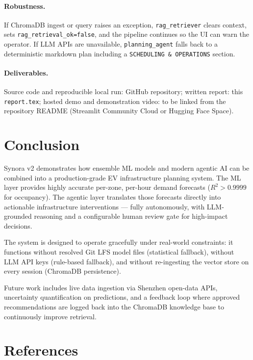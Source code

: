 \documentclass[12pt,a4paper]{article}
\begin{document}
\paragraph{Robustness.}
If ChromaDB ingest or query raises an exception, \texttt{rag\_retriever} clears
context, sets \texttt{rag\_retrieval\_ok=false}, and the pipeline continues so
the UI can warn the operator. If LLM APIs are unavailable, \texttt{planning\_agent}
falls back to a deterministic markdown plan including a
\texttt{SCHEDULING \& OPERATIONS} section.

\paragraph{Deliverables.}
Source code and reproducible local run: GitHub repository;
written report: this \texttt{report.tex};
hosted demo and demonstration video: to be linked from the repository README
(Streamlit Community Cloud or Hugging Face Space).

\section{Conclusion}

Synora v2 demonstrates how ensemble ML models and modern agentic AI can be
combined into a production-grade EV infrastructure planning system. The ML layer
provides highly accurate per-zone, per-hour demand forecasts ($R^2 > 0.9999$ for
occupancy). The agentic layer translates those forecasts directly into actionable
infrastructure interventions — fully autonomously, with LLM-grounded reasoning
and a configurable human review gate for high-impact decisions.

The system is designed to operate gracefully under real-world constraints: it
functions without resolved Git LFS model files (statistical fallback), without
LLM API keys (rule-based fallback), and without re-ingesting the vector store
on every session (ChromaDB persistence).

Future work includes live data ingestion via Shenzhen open-data APIs, uncertainty
quantification on predictions, and a feedback loop where approved recommendations
are logged back into the ChromaDB knowledge base to continuously improve retrieval.

\section*{References}
\end{document}
